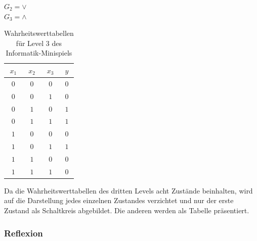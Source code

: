 \begin{table}[h!]
\begin{minipage}{.33\textwidth}
        $G_2 = \lor$\\
        $G_3 = \land$
        \vfill
        \begin{tabular}{|c|c|c|c|} 
            \hline
            $x_1$ & $x_2$ & $x_3$ & $y$\\
            \hline\hline
            $0$ & $0$ & $0$ & $0$\\
            $0$ & $0$ & $1$ & $0$\\
            $0$ & $1$ & $0$ & $1$\\
            $0$ & $1$ & $1$ & $1$\\
            $1$ & $0$ & $0$ & $0$\\
            $1$ & $0$ & $1$ & $1$\\
            $1$ & $1$ & $0$ & $0$\\
            $1$ & $1$ & $1$ & $0$\\
            \hline
        \end{tabular}
    \end{minipage}
    \caption{Wahrheitswerttabellen für Level 3 des Informatik-Minispiels}
    \label{tab:wwt03}
\end{table}

Da die Wahrheitswerttabellen des dritten Levels acht Zustände beinhalten, wird auf die Darstellung jedes einzelnen Zustandes verzichtet und nur der erste Zustand als Schaltkreis abgebildet.
Die anderen werden als Tabelle präsentiert.

\subsubsection{Reflexion}

